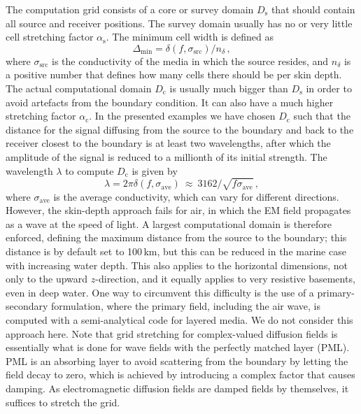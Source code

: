 \documentclass[extra, camera,%
]{gji}
\newcommand{\mr}[1]{\mathrm{#1}}
\begin{document}
The computation grid consists of a core or survey domain $D_\mr{s}$ that should
contain all source and receiver positions. The survey domain usually has no or
very little cell stretching factor $\alpha_\mr{s}$. The minimum cell width is
defined as
%
\begin{equation}
  \Delta_\mr{min}=\delta(f, \sigma_\mr{src})/n_\delta \, ,
  \label{eq:minwidth}
\end{equation}
%
where $\sigma_\mr{src}$ is the conductivity of the media in which the source
resides, and $n_\delta$ is a positive number that defines how many cells there
should be per skin depth. The actual computational domain $D_\mr{c}$ is usually
much bigger than $D_\mr{s}$ in order to avoid artefacts from the boundary
condition. It can also have a much higher stretching factor $\alpha_\mr{c}$. In
the presented examples we have chosen $D_\mr{c}$ such that the distance for the
signal diffusing from the source to the boundary and back to the receiver
closest to the boundary is at least two wavelengths, after which the amplitude
of the signal is reduced to a millionth of its initial strength. The wavelength
$\lambda$ to compute $D_\mr{c}$ is given by
%
\begin{equation}
  \lambda = 2\pi\delta(f, \sigma_\mr{ave})
  \ \approx \ 3162/\sqrt{f\sigma_\mr{ave}}\, ,
 \label{eq:lambda}
\end{equation}
%
where $\sigma_\mr{ave}$ is the average conductivity, which can vary for
different directions. However, the skin-depth approach fails for air, in which
the EM field propagates as a wave at the speed of light. A largest
computational domain is therefore enforced, defining the maximum distance from
the source to the boundary; this distance is by default set to 100\,km, but
this can be reduced in the marine case with increasing water depth. This also
applies to the horizontal dimensions, not only to the upward $z$-direction, and
it equally applies to very resistive basements, even in deep water. One way to
circumvent this difficulty is the use of a primary-secondary formulation, where
the primary field, including the air wave, is computed with a semi-analytical
code for layered media. We do not consider this approach here. Note that grid
stretching for complex-valued diffusion fields is essentially what is done for
wave fields with the perfectly matched layer (PML). PML is an absorbing layer
to avoid scattering from the boundary by letting the field decay to zero, which
is achieved by introducing a complex factor that causes damping. As
electromagnetic diffusion fields are damped fields by themselves, it suffices
to stretch the grid.
\end{document}
